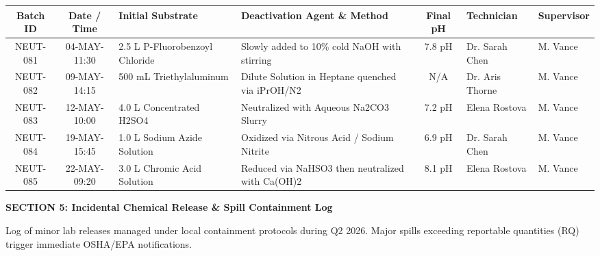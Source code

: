 \documentclass[10pt,a4paper]{article}
\begin{document}
\vspace{-2pt}

{\fontsize{7.5}{9}\selectfont
\begin{tabularx}{\textwidth}{@{} c c p{3.0cm} Y c p{2.2cm} p{1.6cm} @{}}
\toprule
{}
\textbf{Batch ID} & \textbf{Date / Time} & \textbf{Initial Substrate} & \textbf{Deactivation Agent \& Method} & \textbf{Final pH} & \textbf{Technician} & \textbf{Supervisor} \\
\midrule
NEUT-081 & 04-MAY-11:30 & 2.5 L P-Fluorobenzoyl Chloride & Slowly added to 10\% cold NaOH with stirring & 7.8 pH & Dr. Sarah Chen & M. Vance \\
NEUT-082 & 09-MAY-14:15 & 500 mL Triethylaluminum & Dilute Solution in Heptane quenched via iPrOH/N2 & N/A & Dr. Aris Thorne & M. Vance \\
NEUT-083 & 12-MAY-10:00 & 4.0 L Concentrated H2SO4 & Neutralized with Aqueous Na2CO3 Slurry & 7.2 pH & Elena Rostova & M. Vance \\
NEUT-084 & 19-MAY-15:45 & 1.0 L Sodium Azide Solution & Oxidized via Nitrous Acid / Sodium Nitrite & 6.9 pH & Dr. Sarah Chen & M. Vance \\
NEUT-085 & 22-MAY-09:20 & 3.0 L Chromic Acid Solution & Reduced via NaHSO3 then neutralized with Ca(OH)2 & 8.1 pH & Elena Rostova & M. Vance \\
\bottomrule
\end{tabularx}
}

\vspace{3pt}

\begin{tcolorbox}[colback=NavyPrimary, colframe=NavyPrimary, arc=2pt, top=2.5pt, bottom=2.5pt, left=6pt]
  \color{white}\bfseries\small\faExclamationTriangle\quad SECTION 5: Incidental Chemical Release \& Spill Containment Log
\end{tcolorbox}

\vspace{-4pt}

{\fontsize{8}{9.5}\selectfont\color{TextDark}
Log of minor lab releases managed under local containment protocols during Q2 2026. Major spills exceeding reportable quantities (RQ) trigger immediate OSHA/EPA notifications.
}

\vspace{-2pt}
\end{document}
